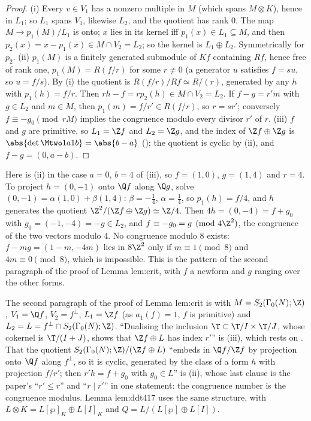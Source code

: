 \begin{proof}
(i) Every $v\in V_1$ has a nonzero multiple in $M$ (which spans $M\otimes K$), hence in $L_1$; so $L_1$ spans $V_1$, likewise $L_2$, and the
quotient has rank $0$. The map $M\to p_1(M)/L_1$ is onto; $x$ lies in its kernel iff $p_1(x)\in L_1\subseteq M$, and then
$p_2(x)=x-p_1(x)\in M\cap V_2=L_2$; so the kernel is $L_1\oplus L_2$. Symmetrically for $p_2$.
(ii) $p_1(M)$ is a finitely generated submodule of $Kf$ containing $Rf$, hence free of rank one, $p_1(M)=R(f/r)$ for some $r\ne0$ (a generator
$u$ satisfies $f=su$, so $u=f/s$). By (i) the quotient is $R(f/r)/Rf\simeq R/(r)$, generated by any $h$ with $p_1(h)=f/r$. Then
$rh-f=rp_2(h)\in M\cap V_2=L_2$. If $f-g=r'm$ with $g\in L_2$ and $m\in M$, then $p_1(m)=f/r'\in R(f/r)$, so $r=sr'$; conversely
$f\equiv-g_0\pmod{rM}$ implies the congruence modulo every divisor $r'$ of $r$.
(iii) $f$ and $g$ are primitive, so $L_1=\Z f$ and $L_2=\Z g$, and the index of $\Z f\oplus\Z g$ is $\abs{\det\Mtwo1a1b}=\abs{b-a}$ ();
the quotient is cyclic by (ii), and $f-g=(0,a-b)$.
\end{proof}

Here is (ii) in the case $a=0$, $b=4$ of (iii), so $f=(1,0)$, $g=(1,4)$ and $r=4$. To project $h=(0,-1)$ onto $\Q f$ along $\Q g$, solve
$(0,-1)=\alpha(1,0)+\beta(1,4)$: $\beta=-\frac14$, $\alpha=\frac14$, so $p_1(h)=f/4$, and $h$ generates the quotient $\Z^2/(\Z f\oplus\Z g)\simeq\Z/4$.
Then $4h=(0,-4)=f+g_0$ with $g_0=(-1,-4)=-g\in L_2$, and $f\equiv-g_0=g\pmod{4\Z^2}$, the congruence of the two vectors modulo $4$. No
congruence modulo $8$ exists: $f-mg=(1-m,-4m)$ lies in $8\Z^2$ only if $m\equiv1\pmod8$ and $4m\equiv0\pmod8$, which is impossible.
This is the pattern of the second paragraph of the proof of Lemma lem:crit, with $f$ a newform and $g$ ranging over the other forms.

\begin{paperlink}\label{pl:modules:crit-second}
The second paragraph of the proof of Lemma lem:crit is  with
$M=S_2(\Gamma_0(N);\Z)$, $V_1=\Q f$, $V_2=f^\perp$, $L_1=\Z f$ (as $a_1(f)=1$, $f$ is primitive) and $L_2=L=f^\perp\cap S_2(\Gamma_0(N);\Z)$.
``Dualising the inclusion $\T\subset\T/I\times\T/J$, whose cokernel is $\T/(I+J)$, shows that $\Z f\oplus L$ has index $r'$'' is
(iii), which rests on . That the quotient $S_2(\Gamma_0(N);\Z)/(\Z f\oplus L)$ ``embeds in $\Q f/\Z f$ by
projection onto $\Q f$ along $f^\perp$, so it is cyclic, generated by the class of a form $h$ with projection $f/r'$; then $r'h=f+g_0$ with
$g_0\in L$'' is (ii), whose last clause is the paper's ``$r'\le r$'' and ``$r\mid r'$'' in one
statement: the congruence number is the congruence modulus. Lemma lem:ddt417 uses the same structure, with
$L\otimes K=L[\wp]_K\oplus L[I]_K$ and $Q=L/(L[\wp]\oplus L[I])$.
\end{paperlink}

